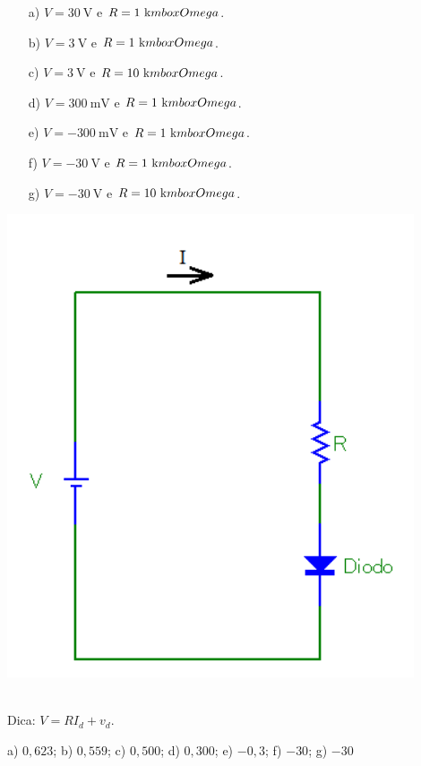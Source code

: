 \begin{minipage}[l]{0.6\linewidth}
\begin{itemize}
\item[a)] $V=30~\mbox{V}$ e $R=1~\mbox{k}\\mbox{Omega}$.
\item[b)] $V=3~\mbox{V}$ e $R=1~\mbox{k}\\mbox{Omega}$.
\item[c)] $V=3~\mbox{V}$ e $R=10~\mbox{k}\\mbox{Omega}$.
\item[d)] $V=300~\mbox{mV}$ e $R=1~\mbox{k}\\mbox{Omega}$.
\item[e)] $V=-300~\mbox{mV}$ e $R=1~\mbox{k}\\mbox{Omega}$.
\item[f)] $V=-30~\mbox{V}$ e $R=1~\mbox{k}\\mbox{Omega}$.
\item[g)] $V=-30~\mbox{V}$ e $R=10~\mbox{k}\\mbox{Omega}$.
\end{itemize}\end{minipage}\begin{minipage}[c]{0.4\linewidth}
\includegraphics[width=0.9\textwidth]{./cap_equacao1d/pics/circuito_diodo.png}
\end{minipage}\\
Dica: $V=RI_d+v_d$.
\begin{Answer}
  \begin{tiny}
    a) $0,623$; b) $0,559$; c) $0,500$; d) $0,300$; e) $-0,3$; f) $-30$; g) $-30$
  \end{tiny}
\end{Answer}


